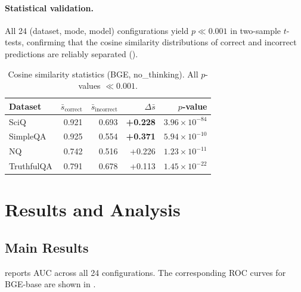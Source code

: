 \documentclass{article}
\begin{document}
\paragraph{Statistical validation.}
All 24 (dataset, mode, model) configurations yield $p \ll 0.001$ in
two-sample $t$-tests, confirming that the cosine similarity distributions of
correct and incorrect predictions are reliably separated ().

\begin{table}[t]
\centering
\caption{Cosine similarity statistics (BGE, no\_thinking). All $p$-values $\ll 0.001$.}
\label{tab:stats}
\begin{tabular}{lrrrr}
\toprule
\textbf{Dataset} & $\bar{s}_{\text{correct}}$ & $\bar{s}_{\text{incorrect}}$ &
  $\Delta\bar{s}$ & $p$-value \\
\midrule
SciQ       & 0.921 & 0.693 & \textbf{+0.228} & $3.96\times10^{-84}$ \\
SimpleQA   & 0.925 & 0.554 & \textbf{+0.371} & $5.94\times10^{-10}$ \\
NQ         & 0.742 & 0.516 & +0.226          & $1.23\times10^{-11}$ \\
TruthfulQA & 0.791 & 0.678 & +0.113          & $1.45\times10^{-22}$ \\
\bottomrule
\end{tabular}
\end{table}

\section{Results and Analysis}
\label{sec:results}

\subsection{Main Results}

 reports AUC across all 24 configurations.
The corresponding ROC curves for BGE-base are shown in .
\end{document}
